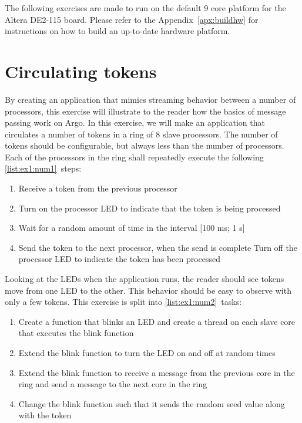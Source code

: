 \documentclass[a4paper,fontsize=10pt,twoside,DIV15,BCOR12mm,headinclude=true,footinclude=false,pagesize,bibtotoc]{scrbook}
\begin{document}
The following exercises are made to run on the default
9 core platform for the Altera DE2-115 board.
Please refer to the Appendix~\ref{apx:buildhw} for instructions on
how to build an up-to-date hardware platform.

\section{Circulating tokens}
By creating an application that mimics streaming behavior between a number of processors, this exercise will illustrate to the reader how the basics of message passing work on Argo.
In this exercise, we will make an application that circulates a number of tokens in a ring of 8 slave processors.
The number of tokens should be configurable, but always less than the number of processors.
Each of the processors in the ring shall repeatedly execute the following \ref{list:ex1:num1}~steps:

\begin{framed}
\begin{enumerate}
\item Receive a token from the previous processor

\item Turn on the processor LED to indicate that the token is being processed

\item Wait for a random amount of time in the interval [100 ms; 1 s]
\label{list:step_rand}
\item Send the token to the next processor, when the send is complete Turn off the processor LED to indicate the token has been processed

\label{list:ex1:num1}\end{enumerate}
\end{framed}

\noindent Looking at the LEDs when the application runs,
the reader should see tokens move from one LED to the other.
This behavior should be easy to observe with only a few tokens.
This exercise is split into \ref{list:ex1:num2}~tasks:
\begin{framed}
\begin{enumerate}
\item Create a function that blinks an LED and create a thread on each slave core that executes the blink function
\item Extend the blink function to turn the LED on and off at random times
\item Extend the blink function to receive a message from the previous core in the ring and send a message to the next core in the ring
\item Change the blink function such that it sends the random seed value along with the token
\label{list:ex1:num2}\end{enumerate}
\end{framed}
\end{document}
